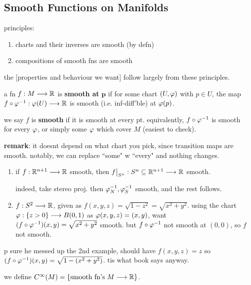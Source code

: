 \subsection{Smooth Functions on Manifolds}

principles:
\begin{enumerate}
    \item charts and their inverses are smooth (by defn)
	\item compositions of smooth fns are smooth
\end{enumerate}
the [properties and behaviour we want] follow largely from these principles.

\begin{defn}
    a fn $f:M\longrightarrow\mathbb{R}$ is \textbf{smooth at} $\bm{p}$ if for some chart
	$(U,\varphi)$ with $p\in U$, the map $f\circ\varphi^{-1}:\varphi(U)\longrightarrow\mathbb{R}$
	is smooth (i.e. inf-diff'ble) at $\varphi(p)$.

	we say $f$ is \textbf{smooth} if it is smooth at every pt.
	equivalently, $f\circ\varphi^{-1}$ is smooth for every $\varphi$,
	or simply some $\varphi$ which cover $M$ (easiest to check).
\end{defn}
\textbf{remark}: it doesnt depend on what chart you pick, since
transition maps are smooth.
notably, we can replace ``some" w ``every" and nothing changes.

\begin{xmp}[source=Primary Source Material]
    \vspace{-0.2in}
	\begin{enumerate}[1)]
		\item if $f:\mathbb{R}^{n+1}\longrightarrow\mathbb{R}$ smooth, then
			$f\big\rvert_{S^{n}}:S^{n}\subseteq\mathbb{R}^{n+1}\longrightarrow\mathbb{R}$ smooth.

			indeed, take stereo proj. then $\varphi_{N}^{-1},\varphi_{S}^{-1}$ smooth,
			and the rest follows.
		\item $f:S^{2}\longrightarrow\mathbb{R}$, given as $f(x,y,z)=\sqrt{1-z^{2}}=\sqrt{x^{2}+y^{2}}$.
			using the chart $\varphi:\left\{{z>0}\right\}\longrightarrow B(0,1)$ as $\varphi(x,y,z)=(x,y)$,
			want $(f\circ\varphi^{-1})(x,y)=\sqrt{x^{2}+y^{2}}$ smooth.
			but $f\circ\varphi^{-1}$ not smooth at $(0,0)$, so $f$ not smooth.
	\end{enumerate}
\end{xmp}
p sure he messed up the 2nd example, should have $f(x,y,z)=z$ so $(f\circ\varphi^{-1})(x,y)=\sqrt{1-(x^{2}+y^{2})}$.
tis what book says anyway.

\begin{defn}
    we define $C^{\infty}(M)=\left\{{\textrm{smooth fn's }M\longrightarrow\mathbb{R}}\right\}$.
\end{defn}

